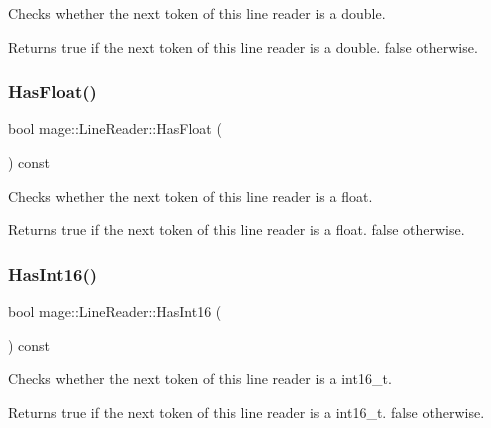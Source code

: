 Checks whether the next token of this line reader is a {\ttfamily double}.

\begin{DoxyReturn}{Returns}
{\ttfamily true} if the next token of this line reader is a {\ttfamily double}. {\ttfamily false} otherwise. 
\end{DoxyReturn}
\hypertarget{classmage_1_1_line_reader_ade0b6d83fc8cd6a4c64b2c97b9ff0bda}{}\label{classmage_1_1_line_reader_ade0b6d83fc8cd6a4c64b2c97b9ff0bda} 
\subsubsection{\texorpdfstring{Has\+Float()}{HasFloat()}}
{\footnotesize\ttfamily bool mage\+::\+Line\+Reader\+::\+Has\+Float (\begin{DoxyParamCaption}{ }\end{DoxyParamCaption}) const\hspace{0.3cm}{\ttfamily [protected]}}

Checks whether the next token of this line reader is a {\ttfamily float}.

\begin{DoxyReturn}{Returns}
{\ttfamily true} if the next token of this line reader is a {\ttfamily float}. {\ttfamily false} otherwise. 
\end{DoxyReturn}
\hypertarget{classmage_1_1_line_reader_a36b83e0adfa48d9226ae59c23df8f44a}{}\label{classmage_1_1_line_reader_a36b83e0adfa48d9226ae59c23df8f44a} 
\subsubsection{\texorpdfstring{Has\+Int16()}{HasInt16()}}
{\footnotesize\ttfamily bool mage\+::\+Line\+Reader\+::\+Has\+Int16 (\begin{DoxyParamCaption}{ }\end{DoxyParamCaption}) const\hspace{0.3cm}{\ttfamily [protected]}}

Checks whether the next token of this line reader is a {\ttfamily int16\+\_\+t}.

\begin{DoxyReturn}{Returns}
{\ttfamily true} if the next token of this line reader is a {\ttfamily int16\+\_\+t}. {\ttfamily false} otherwise. 
\end{DoxyReturn}
\hypertarget{classmage_1_1_line_reader_af8402b39637e27877eac2909604bbf89}{}\label{classmage_1_1_line_reader_af8402b39637e27877eac2909604bbf89} 
